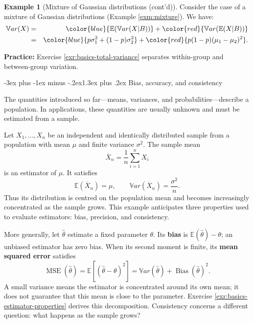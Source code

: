 \documentclass[
  11pt,
]{book}
\makeatletter
\renewcommand\section{\@startsection{section}{1}{\z@}
  {-3ex plus -1ex minus -.2ex}{1.3ex plus .2ex}
  {\normalfont\Large\bfseries\color{TextbookInk}}}
\theoremstyle{definition}
\theoremstyle{definition}
\newtheorem{example}{Example}[chapter]
\theoremstyle{definition}
\theoremstyle{definition}
\theoremstyle{remark}
\makeatother
\begin{document}
\begin{example}[Mixture of Gaussian distributions (cont'd)]
\protect\hypertarget{exm:mixture2}{}\label{exm:mixture2}Consider the case of a mixture of Gaussian distributions (Example \ref{exm:mixture}). We have:
\begin{eqnarray*}
\mathbb{V}ar(X) &=& \color{blue}{\mathbb{E}(\mathbb{V}ar(X|B))} + \color{red}{\mathbb{V}ar(\mathbb{E}(X|B))}\\
&=&  \color{blue}{p\sigma_1^2+(1-p)\sigma_2^2} + \color{red}{p(1-p)(\mu_1 - \mu_2)^2}.
\end{eqnarray*}
\end{example}

\begin{practicebox}
\textbf{Practice:} Exercise \ref{exr:basics-total-variance} separates within-group and between-group variation.

\end{practicebox}

\section{Bias, accuracy, and consistency}\label{basics-estimators}

The quantities introduced so far---means, variances, and probabilities---describe a population. In applications, these quantities are usually unknown and must be estimated from a sample.

Let \(X_1,\ldots,X_n\) be an independent and identically distributed sample from a population with mean \(\mu\) and finite variance \(\sigma^2\). The sample mean
\[
\overline X_n=\frac{1}{n}\sum_{i=1}^n X_i
\]
is an estimator of \(\mu\). It satisfies
\[
\mathbb{E}(\overline X_n)=\mu,
\qquad
\mathbb{V}ar(\overline X_n)=\frac{\sigma^2}{n}.
\]
Thus its distribution is centred on the population mean and becomes increasingly concentrated as the sample grows. This example anticipates three properties used to evaluate estimators: bias, precision, and consistency.

More generally, let \(\widehat\theta\) estimate a fixed parameter \(\theta\). Its \textbf{bias} is \(\mathbb{E}(\widehat\theta)-\theta\); an unbiased estimator has zero bias. When its second moment is finite, its \textbf{mean squared error} satisfies
\[
\operatorname{MSE}(\widehat\theta)=\mathbb{E}[(\widehat\theta-\theta)^2]
=\mathbb{V}ar(\widehat\theta)+\operatorname{Bias}(\widehat\theta)^2.
\]
A small variance means the estimator is concentrated around its own mean; it does not guarantee that this mean is close to the parameter. Exercise \ref{exr:basics-estimator-properties} derives this decomposition. Consistency concerns a different question: what happens as the sample grows?
\end{document}
